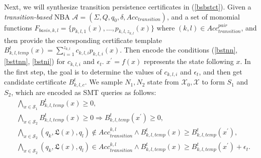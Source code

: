 \documentclass[acmlarge]{acmart}
\begin{document}
Next, we will synthesize transition persistence certificates in (\ref{bsbstct}). Given a \emph{transition-based} NBA $\mathcal{A}=(\Sigma, Q, q_0, \delta, Acc_{transition})$, and a set of monomial functions $F_{basis, k, l} = \{p_{k, l, 1}(x), \dots, p_{k, l, z_{k,l}}(x)\}$ where $(k, l) \in Acc_{transition}^{pair}$, and then provide the corresponding certificate template $B^t_{k, l, temp}(x) = \sum_{i=1}^{z_{k,l}} c_{k,l,i}p_{k,l,i}(x)$. Then encode the conditions (\ref{bstnn}, \ref{bsttnn}, \ref{bstni}) for $c_{k, l, i}$ and $\epsilon_t$. $x^{\prime} = f(x)$ represents the state following $x$. In the first step, the goal is to determine the values of $c_{k, l, i}$ and $\epsilon_t$, and then get candidate certificate $B^t_{k, l, c}$. We sample $N_1, N_2$ state from $\mathcal{X}_0, \mathcal{X}$ to form $S_1$ and $S_2$, which are encoded as SMT queries as follows:
\begin{align}
&\bigwedge_{x \in \mathcal{S}_1} B^t_{k, l, temp}(x) \geq 0, \label{smtbstpt0}\\
&\bigwedge_{x \in \mathcal{S}_2} B^t_{k, l, temp}(x) \geq 0 \Rightarrow B^t_{k, l, temp}(x^{\prime}) \geq 0, \label{smtbstpt1}\\
&\bigwedge_{x \in \mathcal{S}_2} (q_k, \mathfrak{L}(x), q_l) \not\in Acc_{transition}^{k, l} \land B^t_{k, l, temp}(x) \geq B^t_{k, l, temp}(x^{\prime}), \label{smtbstpt2}\\
&\bigwedge_{x \in \mathcal{S}_2} (q_k, \mathfrak{L}(x), q_l) \in Acc_{transition}^{k, l} \land B^t_{k, l, temp}(x) \geq B^t_{k, l, temp}(x^{\prime}) + \epsilon_t. \label{smtbstpt3}
\end{align}
\end{document}
